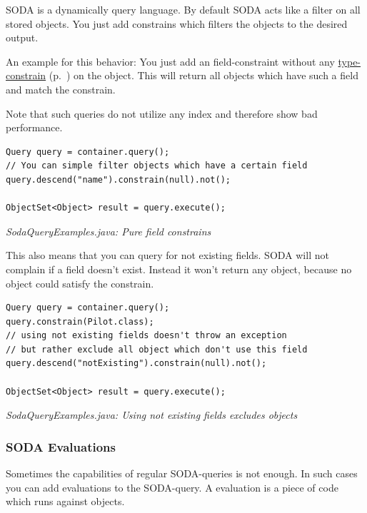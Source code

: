 SODA is a dynamically query language. By default SODA acts like a filter on all stored objects. You just add constrains which filters the objects to the desired output.

An example for this behavior: You just add an field-constraint without any \hyperref[ref:basics-querying-soda-soda-example-catelog]{type-constrain} (p.~\pageref{ref:basics-querying-soda-soda-example-catelog}) on the object. This will return all objects which have such a field and match the constrain.

Note that such queries do not utilize any index and therefore show bad performance.

\begin{lstlisting}
Query query = container.query();
// You can simple filter objects which have a certain field
query.descend("name").constrain(null).not();

ObjectSet<Object> result = query.execute();
\end{lstlisting}

{\small\itshape SodaQueryExamples.java: Pure field constrains\par}
\medskip

This also means that you can query for not existing fields. SODA will not complain if a field doesn't exist. Instead it won't return any object, because no object could satisfy the constrain.

\begin{lstlisting}
Query query = container.query();
query.constrain(Pilot.class);
// using not existing fields doesn't throw an exception
// but rather exclude all object which don't use this field
query.descend("notExisting").constrain(null).not();

ObjectSet<Object> result = query.execute();
\end{lstlisting}

{\small\itshape SodaQueryExamples.java: Using not existing fields excludes objects\par}
\medskip

\subsubsection{SODA Evaluations}
\label{ref:basics-querying-soda-soda-evaluations}

Sometimes the capabilities of regular SODA-queries is not enough. In such cases you can add evaluations to the SODA-query. A evaluation is a piece of code which runs against objects.

